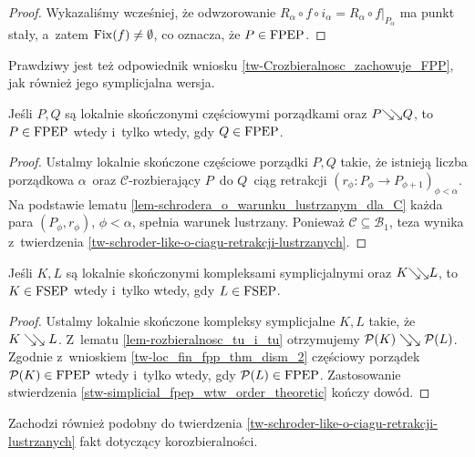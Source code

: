 \begin{proof}
Wykazaliśmy wcześniej, że odwzorowanie $R_\alpha\circ f\circ i_\alpha=R_\alpha\circ f\big|_{P_\alpha}$ ma punkt stały, a~zatem $\operatorname{Fix}(f)\not=\emptyset$, co oznacza, że $P\in\mathrm{FPEP}$.
\end{proof}

Prawdziwy jest też odpowiednik wniosku \ref{tw-Crozbieralnosc_zachowuje_FPP}, jak również jego symplicjalna wersja.

\begin{wn}\label{tw-loc_fin_fpp_thm_dism_2}
Jeśli $P,Q$ są lokalnie skończonymi częściowymi porządkami oraz $P{\searrow\!\!\searrow} Q$, to $P\in\mathrm{FPEP}$ wtedy i~tylko wtedy, gdy $Q\in\mathrm{FPEP}$.
\end{wn}
\begin{proof}
Ustalmy lokalnie skończone częściowe porządki $P,Q$ takie, że istnieją liczba porządkowa $\alpha$~oraz \mbox{$\mathcal{C}$-rozbierający} $P$~do $Q$~ciąg retrakcji $\left(r_\phi\colon P_\phi\to P_{\phi+1}\right)_{\phi<\alpha}$. Na podstawie lematu \ref{lem-schrodera_o_warunku_lustrzanym_dla_C} każda para $\left(P_\phi,r_\phi\right)$, $\phi<\alpha$, spełnia warunek lustrzany. Ponieważ $\mathcal{C}\subseteq\mathcal{B}_1$, teza wynika z~twierdzenia \ref{tw-schroder-like-o-ciagu-retrakcji-lustrzanych}.
\end{proof}

\begin{wn}\label{tw-loc_fin_fpp_thm_dism_2_simplicial}
Jeśli $K,L$ są lokalnie skończonymi kompleksami symplicjalnymi oraz $K{\searrow\!\!\searrow} L$, to $K\in\mathrm{FSEP}$ wtedy i~tylko wtedy, gdy $L\in\mathrm{FSEP}$.
\end{wn}
\begin{proof}
Ustalmy lokalnie skończone kompleksy symplicjalne $K, L$ takie, że \mbox{$K\searrow\!\!\searrow L$}. Z~lematu \ref{lem-rozbieralnosc_tu_i_tu} otrzymujemy $\mathcal{P}(K)\searrow\!\!\searrow \mathcal{P}(L)$. Zgodnie z~wnioskiem \ref{tw-loc_fin_fpp_thm_dism_2} częściowy porządek $\mathcal{P}(K)\in\mathrm{FPEP}$ wtedy i~tylko wtedy, gdy $\mathcal{P}(L)\in\mathrm{FPEP}$. Zastosowanie stwierdzenia \ref{stw-simplicial_fpep_wtw_order_theoretic} kończy dowód.
\end{proof}

Zachodzi również podobny do twierdzenia \ref{tw-schroder-like-o-ciagu-retrakcji-lustrzanych} fakt dotyczący korozbieralności.

